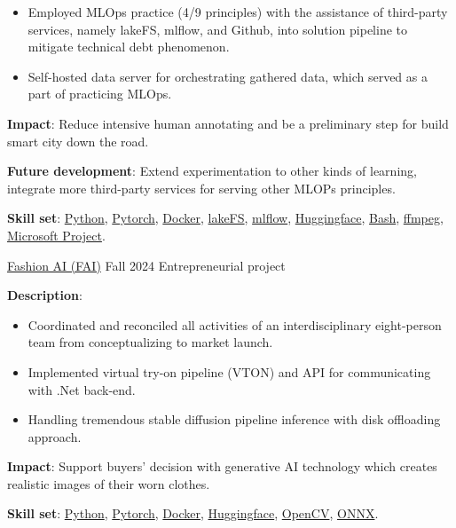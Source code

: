 \documentclass{src/preamble/doc_class}
\begin{document}
\begin{MainPart}
{\begin{itemize}[label=$\bullet$,topsep=-.5ex,itemsep=-0.5ex]
            	\item Employed MLOps practice (4/9 principles) with the assistance of third-party services, namely lakeFS, mlflow, and Github, into solution pipeline to mitigate technical debt phenomenon.
            	
            	\item Self-hosted data server for orchestrating gathered data, which served as a part of practicing MLOps.
            \end{itemize}
            \vspace{.15cm}
            
            \textbf{Impact}: Reduce intensive human annotating and be a preliminary step for build smart city down the road.
            \vspace{.15cm}
            
            \textbf{Future development}: Extend experimentation to other kinds of learning, integrate more third-party services for serving other MLOPs principles.
            \vspace{.1cm}

            \textbf{Skill set}: \href{https://www.python.org/}{Python}, \href{https://pytorch.org/}{Pytorch}, \href{https://www.docker.com/}{Docker}, \href{https://lakefs.io/}{lakeFS}, \href{https://mlflow.org/}{mlflow}, \href{https://huggingface.co/}{Huggingface}, \href{https://www.gnu.org/software/bash/}{Bash}, \href{https://ffmpeg.org/}{ffmpeg}, \href{https://www.microsoft.com/en/microsoft-365/planner/microsoft-planner?market=af}{Microsoft Project}.
        }
		
		\Experience
		{\ColorHighlight}
		{\href{https://fashion-ai-innovation.vercel.app/}{Fashion AI (FAI)}}
		{Fall 2024}
		{Entrepreneurial project}
		{
			\textbf{Description}:
			\begin{itemize}[label=$\bullet$,topsep=-.5ex,itemsep=-0.5ex]
				\item Coordinated and reconciled all activities of an interdisciplinary eight-person team from conceptualizing to market launch.
				
				\item Implemented virtual try-on pipeline (VTON) and API for communicating with .Net back-end.
				
				\item Handling tremendous stable diffusion pipeline inference with disk offloading approach.
			\end{itemize}
			\vspace{0.15cm}
			
			\textbf{Impact}: Support buyers' decision with generative AI technology which creates realistic images of their worn clothes.
			\vspace{.15cm}
			
			\textbf{Skill set}: \href{https://www.python.org/}{Python}, \href{https://pytorch.org/}{Pytorch}, \href{https://www.docker.com/}{Docker}, \href{https://huggingface.co/}{Huggingface}, \href{https://opencv.org/}{OpenCV}, \href{https://onnx.ai/}{ONNX}.
		}
		\end{MainPart}
		\newpage        
\end{document}
